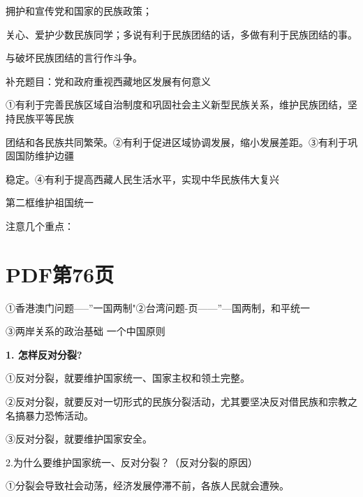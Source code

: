\documentclass[lang=cn,11pt]{elegantbook}
\newcommand{\daofasym}[1]{{\daofasymbolfont #1}}
\newcommand{\daofasym}[1]{#1}
\begin{document}
拥护和宣传党和国家的民族政策；\par

关心、爱护少数民族同学；多说有利于民族团结的话，多做有利于民族团结的事。\par

与破坏民族团结的言行作斗争。\par

补充题目：党和政府重视西藏地区发展有何意义\par

\daofasym{①}有利于完善民族区域自治制度和巩固社会主义新型民族关系，维护民族团结，坚持民族平等民族\par

团结和各民族共同繁荣。\daofasym{②}有利于促进区域协调发展，缩小发展差距。\daofasym{③}有利于巩固国防维护边疆\par

稳定。\daofasym{④}有利于提高西藏人民生活水平，实现中华民族伟大复兴\par

第二框维护祖国统一\par

注意几个重点：\par


\section*{PDF第76页}

\daofasym{①}香港澳门问题-----”一国两制"\daofasym{②}台湾问题-页——”—国两制，和平统一\par

\daofasym{③}两岸关系的政治基础 一个中国原则\par

\textbf{1. 怎样反对分裂?}\par

\daofasym{①}反对分裂，就要维护国家统一、国家主权和领土完整。\par

\daofasym{②}反对分裂，就要反对一切形式的民族分裂活动，尤其要坚决反对借民族和宗教之名搞暴力恐怖活动。\par

\daofasym{③}反对分裂，就要维护国家安全。\par

2.为什么要维护国家统一、反对分裂？（反对分裂的原因）\par

\daofasym{①}分裂会导致社会动荡，经济发展停滞不前，各族人民就会遭殃。\par
\end{document}
